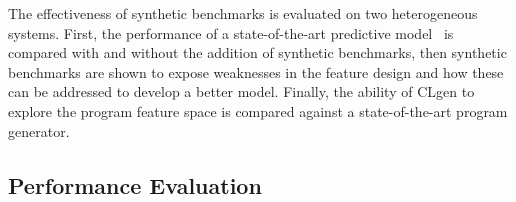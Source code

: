 The effectiveness of synthetic benchmarks is evaluated on two heterogeneous systems. First, the performance of a state-of-the-art predictive model~\cite{Grewe2013} is compared with and without the addition of synthetic benchmarks, then synthetic benchmarks are shown to expose weaknesses in the feature design and how these can be addressed to develop a better model. Finally, the ability of CLgen to explore the program feature space is compared against a state-of-the-art program generator.


\subsection{Performance Evaluation}

\begin{figure}
  \centering %
\end{figure}
